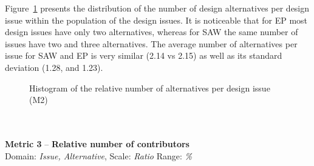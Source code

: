 \documentclass[article]{elsarticle}
\begin{document}
Figure~\ref{fig:M2} presents the distribution of the number of design alternatives per design issue within the population of the design issues. It is noticeable that for EP most design issues have only two alternatives, whereas for SAW the same number of issues have two and three alternatives. The average number of alternatives per issue for SAW and EP is very similar (2.14 vs 2.15) as well as its standard deviation (1.28, and 1.23).
\begin{figure}
	\begin{center}
	\end{center}

	\caption{Histogram of the relative number of alternatives per design issue (M2)}
	\label{fig:M2}

	\begin{comment}
	  \begin{center}
	  \texttt{[image: M2.pdf]}
	  \caption{Histogram of the relative number of alternatives per design issue}
	  \label{fig:M2}
	  \end{center}
	\end{comment}

\end{figure}
\\
\\
\noindent
\textbf{Metric 3} -- \textbf{Relative number of contributors}\\
Domain: \emph{Issue, Alternative}, Scale: \emph{Ratio} Range: \emph{\%}
\end{document}
